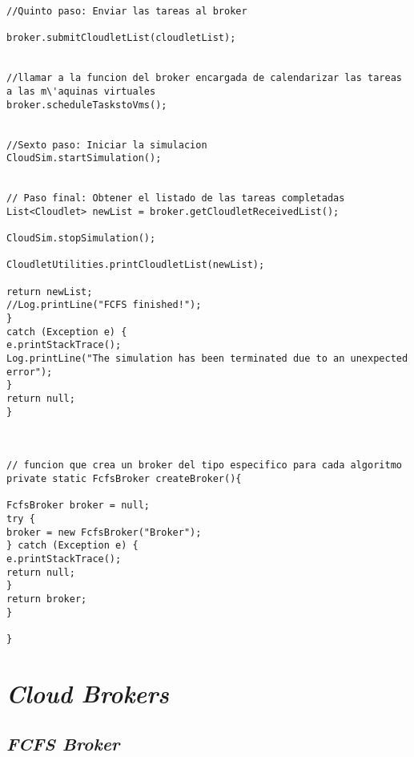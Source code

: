 \begin{lstlisting}
//Quinto paso: Enviar las tareas al broker

broker.submitCloudletList(cloudletList);


//llamar a la funcion del broker encargada de calendarizar las tareas a las m\'aquinas virtuales
broker.scheduleTaskstoVms();


//Sexto paso: Iniciar la simulacion
CloudSim.startSimulation();


// Paso final: Obtener el listado de las tareas completadas
List<Cloudlet> newList = broker.getCloudletReceivedList();

CloudSim.stopSimulation();

CloudletUtilities.printCloudletList(newList);

return newList;
//Log.printLine("FCFS finished!");
}
catch (Exception e) {
e.printStackTrace();
Log.printLine("The simulation has been terminated due to an unexpected error");
}
return null;
}



// funcion que crea un broker del tipo especifico para cada algoritmo
private static FcfsBroker createBroker(){

FcfsBroker broker = null;
try {
broker = new FcfsBroker("Broker");
} catch (Exception e) {
e.printStackTrace();
return null;
}
return broker;
}

}

\end{lstlisting}

\newpage

\section*{\textit{Cloud Brokers}}
\subsection*{\textit{FCFS Broker}}

